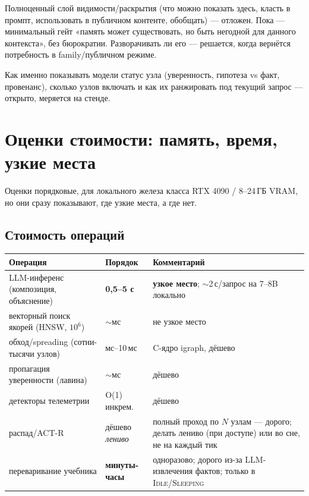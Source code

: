 \begin{openq}
Полноценный слой видимости/раскрытия (что можно показать здесь, класть в промпт,
использовать в публичном контенте, обобщать) — отложен. Пока — минимальный гейт
«память может существовать, но быть негодной для данного контекста», без бюрократии.
Разворачивать ли его — решается, когда вернётся потребность в family/публичном режиме.
\end{openq}

\begin{openq}
Как именно показывать модели статус узла (уверенность, гипотеза vs факт, провенанс),
сколько узлов включать и как их ранжировать под текущий запрос — открыто, меряется на
стенде.
\end{openq}

\section{Оценки стоимости: память, время, узкие места}
\label{sec:costs}

Оценки порядковые, для локального железа класса RTX 4090 / 8--24\,ГБ VRAM, но они
сразу показывают, где узкие места, а где нет.

\subsection{Стоимость операций}

\begin{center}
\begin{tabular}{p{} p{} p{}}
\toprule
\textbf{Операция} & \textbf{Порядок} & \textbf{Комментарий} \\
\midrule
LLM-инференс (композиция, объяснение) & \textbf{0,5--5 с} & \textbf{узкое место}; $\sim$2\,с/запрос на 7--8B локально \\
векторный поиск якорей (HNSW, $10^6$) & $\sim$мс & не узкое место \\
обход/spreading (сотни-тысячи узлов) & мс--10\,мс & C-ядро igraph, дёшево \\
пропагация уверенности (лавина) & $\sim$мс & дёшево \\
детекторы телеметрии & O(1) инкрем. & дёшево \\
распад/ACT-R & дёшево \emph{лениво} & полный проход по $N$ узлам — дорого; делать лениво (при доступе) или во сне, не на каждый тик \\
переваривание учебника & \textbf{минуты-часы} & одноразово; дорого из-за LLM-извлечения фактов; только в \textsc{Idle}/\textsc{Sleeping} \\
\bottomrule
\end{tabular}
\end{center}

